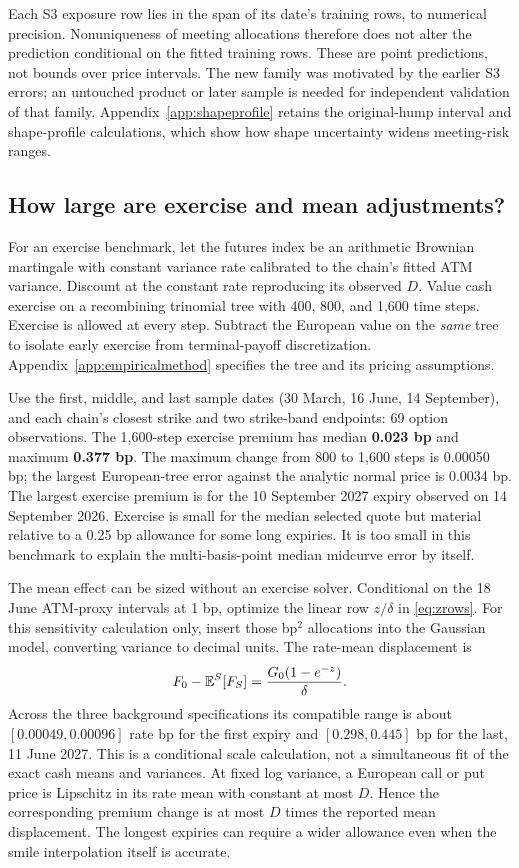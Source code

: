 Each S3 exposure row lies in the span of its date's training rows, to numerical precision. Nonuniqueness of meeting allocations therefore does not alter the prediction conditional on the fitted training rows. These are point predictions, not bounds over price intervals. The new family was motivated by the earlier S3 errors; an untouched product or later sample is needed for independent validation of that family. Appendix~\ref{app:shapeprofile} retains the original-hump interval and shape-profile calculations, which show how shape uncertainty widens meeting-risk ranges.

\subsection{How large are exercise and mean adjustments?}\label{sec:exerciseempirical}
For an exercise benchmark, let the futures index be an arithmetic Brownian martingale with constant variance rate calibrated to the chain's fitted ATM variance. Discount at the constant rate reproducing its observed $D$. Value cash exercise on a recombining trinomial tree with 400, 800, and 1,600 time steps. Exercise is allowed at every step. Subtract the European value on the \emph{same} tree to isolate early exercise from terminal-payoff discretization. Appendix~\ref{app:empiricalmethod} specifies the tree and its pricing assumptions.

Use the first, middle, and last sample dates (30 March, 16 June, 14 September), and each chain's closest strike and two strike-band endpoints: 69 option observations. The 1,600-step exercise premium has median \textbf{0.023 bp} and maximum \textbf{0.377 bp}. The maximum change from 800 to 1,600 steps is 0.00050 bp; the largest European-tree error against the analytic normal price is 0.0034 bp. The largest exercise premium is for the 10 September 2027 expiry observed on 14 September 2026. Exercise is small for the median selected quote but material relative to a 0.25 bp allowance for some long expiries. It is too small in this benchmark to explain the multi-basis-point median midcurve error by itself. 

The mean effect can be sized without an exercise solver. Conditional on the 18 June ATM-proxy intervals at 1 bp, optimize the linear row $z/\delta$ in \eqref{eq:zrows}. For this sensitivity calculation only, insert those bp$^2$ allocations into the Gaussian model, converting variance to decimal units. The rate-mean displacement is
\[
F_0-\mathbb E^S[F_S]=\frac{G_0(1-e^{-z})}{\delta}.
\]
Across the three background specifications its compatible range is about $[0.00049,0.00096]$ rate bp for the first expiry and $[0.298,0.445]$ bp for the last, 11 June 2027. This is a conditional scale calculation, not a simultaneous fit of the exact cash means and variances. At fixed log variance, a European call or put price is Lipschitz in its rate mean with constant at most $D$. Hence the corresponding premium change is at most $D$ times the reported mean displacement. The longest expiries can require a wider allowance even when the smile interpolation itself is accurate.

